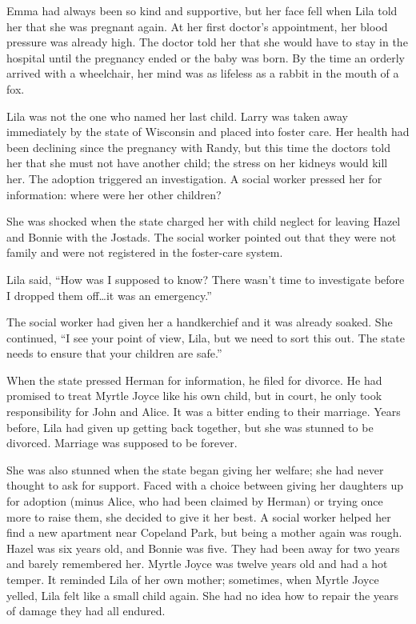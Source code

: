 \documentclass[
  letterpaper,
]{book}
\begin{document}
Emma had always been so kind and supportive, but her face fell when Lila
told her that she was pregnant again. At her first doctor's appointment,
her blood pressure was already high. The doctor told her that she would
have to stay in the hospital until the pregnancy ended or the baby was
born. By the time an orderly arrived with a wheelchair, her mind was as
lifeless as a rabbit in the mouth of a fox.

Lila was not the one who named her last child. Larry was taken away
immediately by the state of Wisconsin and placed into foster care. Her
health had been declining since the pregnancy with Randy, but this time
the doctors told her that she must not have another child; the stress on
her kidneys would kill her. The adoption triggered an investigation. A
social worker pressed her for information: where were her other
children?

She was shocked when the state charged her with child neglect for
leaving Hazel and Bonnie with the Jostads. The social worker pointed out
that they were not family and were not registered in the foster-care
system.

Lila said, ``How was I supposed to know? There wasn't time to
investigate before I dropped them off\ldots it was an emergency.''

The social worker had given her a handkerchief and it was already
soaked. She continued, ``I see your point of view, Lila, but we need to
sort this out. The state needs to ensure that your children are safe.''

When the state pressed Herman for information, he filed for divorce. He
had promised to treat Myrtle Joyce like his own child, but in court, he
only took responsibility for John and Alice. It was a bitter ending to
their marriage. Years before, Lila had given up getting back together,
but she was stunned to be divorced. Marriage was supposed to be forever.

She was also stunned when the state began giving her welfare; she had
never thought to ask for support. Faced with a choice between giving her
daughters up for adoption (minus Alice, who had been claimed by Herman)
or trying once more to raise them, she decided to give it her best. A
social worker helped her find a new apartment near Copeland Park, but
being a mother again was rough. Hazel was six years old, and Bonnie was
five. They had been away for two years and barely remembered her. Myrtle
Joyce was twelve years old and had a hot temper. It reminded Lila of her
own mother; sometimes, when Myrtle Joyce yelled, Lila felt like a small
child again. She had no idea how to repair the years of damage they had
all endured.
\end{document}
